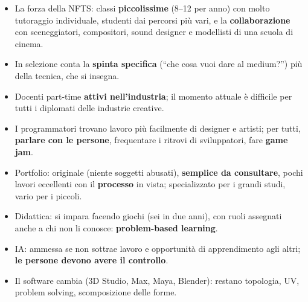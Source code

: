 \begin{itemize}
  \item La forza della NFTS: classi \textbf{piccolissime} (8--12 per anno) con molto
        tutoraggio individuale, studenti dai percorsi più vari, e la
        \textbf{collaborazione} con sceneggiatori, compositori, sound designer e
        modellisti di una scuola di cinema.
  \item In selezione conta la \textbf{spinta specifica} (``che cosa vuoi dare al
        medium?'') più della tecnica, che si insegna.
  \item Docenti part-time \textbf{attivi nell'industria}; il momento attuale è
        difficile per tutti i diplomati delle industrie creative.
  \item I programmatori trovano lavoro più facilmente di designer e artisti; per
        tutti, \textbf{parlare con le persone}, frequentare i ritrovi di
        sviluppatori, fare \textbf{game jam}.
  \item Portfolio: originale (niente soggetti abusati), \textbf{semplice da
        consultare}, pochi lavori eccellenti con il \textbf{processo} in vista;
        specializzato per i grandi studi, vario per i piccoli.
  \item Didattica: si impara facendo giochi (sei in due anni), con ruoli assegnati
        anche a chi non li conosce: \textbf{problem-based learning}.
  \item IA: ammessa se non sottrae lavoro e opportunità di apprendimento agli
        altri; \textbf{le persone devono avere il controllo}.
  \item Il software cambia (3D Studio, Max, Maya, Blender): restano topologia, UV,
        problem solving, scomposizione delle forme.
\end{itemize}
